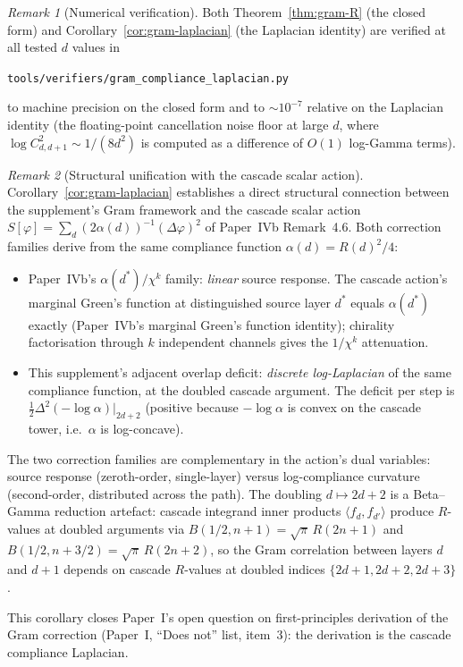 \documentclass[12pt,a4paper]{article}
\theoremstyle{remark}
\newtheorem*{remark}{Remark}
\begin{document}
\begin{remark}[Numerical verification]\label{rem:gram-verifier}
Both Theorem~\ref{thm:gram-R} (the closed form) and Corollary~\ref{cor:gram-laplacian} (the Laplacian identity) are verified at all tested $d$ values in
\begin{center}
\texttt{tools/verifiers/gram\_compliance\_laplacian.py}
\end{center}
to machine precision on the closed form and to $\sim 10^{-7}$ relative on the Laplacian identity (the floating-point cancellation noise floor at large $d$, where $\log C^2_{d,d+1} \sim 1/(8d^2)$ is computed as a difference of $O(1)$ log-Gamma terms).
\end{remark}

\begin{remark}[Structural unification with the cascade scalar action]\label{rem:gram-action-unification}
Corollary~\ref{cor:gram-laplacian} establishes a direct structural connection between the supplement's Gram framework and the cascade scalar action $S[\varphi] = \sum_d (2\alpha(d))^{-1}(\Delta\varphi)^2$ of Paper~IVb Remark~4.6. Both correction families derive from the same compliance function $\alpha(d) = R(d)^2/4$:
\begin{itemize}
\item Paper~IVb's $\alpha(d^*)/\chi^k$ family: \emph{linear} source response. The cascade action's marginal Green's function at distinguished source layer $d^*$ equals $\alpha(d^*)$ exactly (Paper~IVb's marginal Green's function identity); chirality factorisation through $k$ independent channels gives the $1/\chi^k$ attenuation.
\item This supplement's adjacent overlap deficit: \emph{discrete log-Laplacian} of the same compliance function, at the doubled cascade argument. The deficit per step is $\frac{1}{2}\Delta^2(-\log\alpha)|_{2d+2}$ (positive because $-\log\alpha$ is convex on the cascade tower, i.e.\ $\alpha$ is log-concave).
\end{itemize}
The two correction families are complementary in the action's dual variables: source response (zeroth-order, single-layer) versus log-compliance curvature (second-order, distributed across the path). The doubling $d\mapsto 2d+2$ is a Beta--Gamma reduction artefact: cascade integrand inner products $\langle f_d, f_{d'}\rangle$ produce $R$-values at doubled arguments via $B(1/2, n+1) = \sqrt{\pi}\,R(2n+1)$ and $B(1/2, n+3/2) = \sqrt{\pi}\,R(2n+2)$, so the Gram correlation between layers $d$ and $d+1$ depends on cascade $R$-values at doubled indices $\{2d+1, 2d+2, 2d+3\}$.

This corollary closes Paper~I's open question on first-principles derivation of the Gram correction (Paper~I, ``Does not'' list, item~3): the derivation is the cascade compliance Laplacian.
\end{remark}
\end{document}

